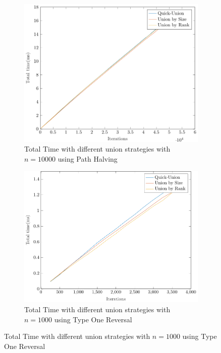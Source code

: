 \begin{figure}[ht]
    \hfill
    \begin{subfigure}{0.32\textwidth}
        \centering
        \includegraphics[width=\textwidth]{../images/plotPHFull10000_time(ms).pdf}
        \caption{Total Time with different union strategies with $n = 10000$ using Path Halving}
    \end{subfigure}
    \begin{subfigure}{0.32\textwidth}
        \centering
        \includegraphics[width=\textwidth]{../images/plotTORFull1000_time(ms).pdf}
        \caption{Total Time with different union strategies with $n = 1000$ using Type One Reversal}
    \end{subfigure}%

\end{figure}
